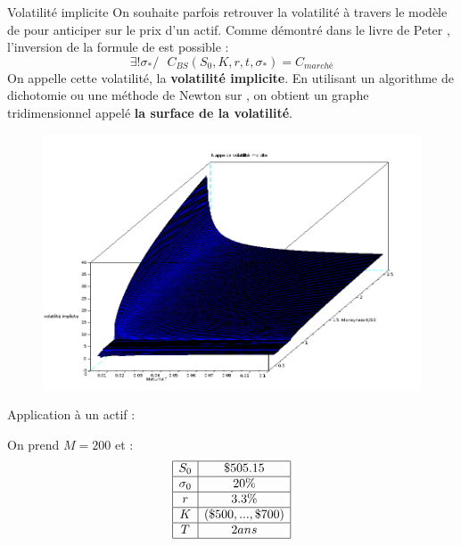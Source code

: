 \documentclass[final]{beamer}
\newlength{\onecolwid}
\begin{document}
\begin{frame}[t]
\begin{columns}[t]
\begin{column}{\onecolwid}
\begin{block}{Volatilité implicite}
On souhaite parfois retrouver la volatilité à travers le modèle de  pour anticiper sur le prix d'un actif. \newline
Comme démontré dans le livre de Peter , l'inversion de la formule de  est possible :
  $$ \exists ! \sigma_* / \ \ \ C_{BS}(S_0,K,r,t,\sigma_*) = C_{marché} $$
  On appelle cette volatilité, la \textbf{volatilité implicite}.
\newline
  En utilisant un algorithme de dichotomie ou une méthode de Newton sur , on obtient un graphe tridimensionnel appelé \textbf{la surface de la volatilité}.
    \begin{figure}
      \includegraphics[scale=0.60]{volimpl1.png}
      \label{Exemple de surface de volatilité}
    \end{figure}
\end{block}

\begin{block}{Application à un actif :}
  \begin{minipage}{0.49\textwidth}
    On prend $M = 200$ et :
      \[
        \begin{array}{|c|c|}
          \hline
          S_0 & \$ 505.15  \\ \hline
          \sigma_0 & 20\% \\ \hline
          r & 3.3 \% \\ \hline
          K & (\$500,...,\$700) \\ \hline
          T & 2 ans \\ \hline
        \end{array}
      \]
  \end{minipage}


\end{block}
\end{column}
\end{columns}
\end{frame}
\end{document}
